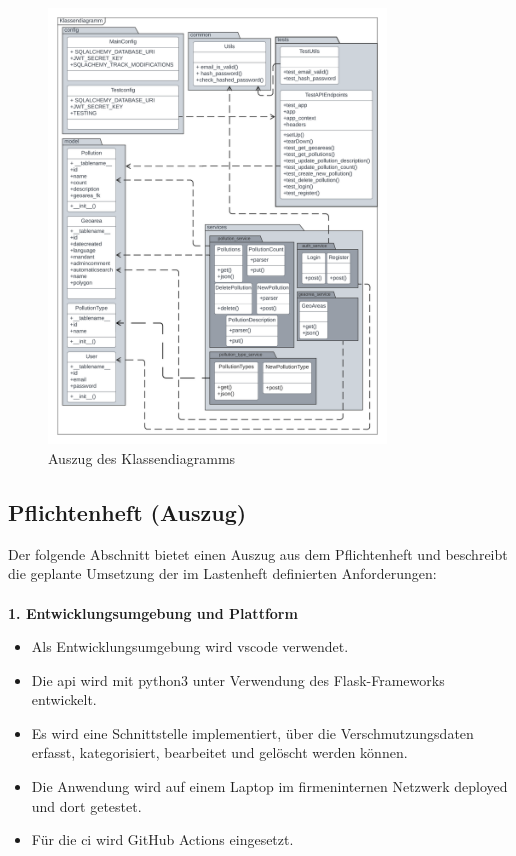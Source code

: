 \documentclass[a4paper,12pt]{article}
\begin{document}
\begin{figure}[h]
\centering
\includegraphics[width=0.8\textwidth]{bilder/klassendiagramm.png}
\caption{Auszug des Klassendiagramms}
\end{figure}

\clearpage
\subsection{Pflichtenheft (Auszug)}
\label{sec:pflichtenheft}

Der folgende Abschnitt bietet einen Auszug aus dem Pflichtenheft und beschreibt die geplante Umsetzung der im Lastenheft definierten Anforderungen:\\
\\
\noindent\textbf{1. Entwicklungsumgebung und Plattform}
\begin{itemize}
    \item Als Entwicklungsumgebung wird \acrshort{vscode} verwendet.
    \item Die \acrshort{api} wird mit \acrshort{python3} unter Verwendung des Flask-Frameworks entwickelt.
    \item Es wird eine Schnittstelle implementiert, über die Verschmutzungsdaten erfasst, kategorisiert, bearbeitet und gelöscht werden können.
    \item Die Anwendung wird auf einem Laptop im firmeninternen Netzwerk deployed und dort getestet.
    \item Für die \acrshort{ci} wird GitHub Actions eingesetzt.
\end{itemize}
\end{document}
